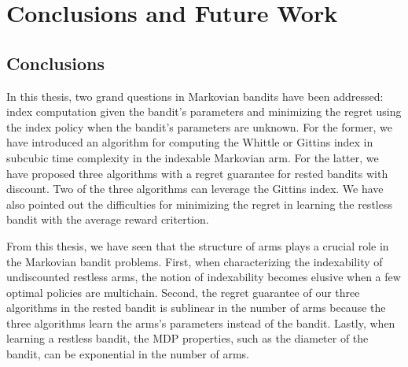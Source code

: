 \begingroup

\let\clearpage\relax

\chapter{Conclusions and Future Work}
\label{chapter:conclusion}


\section{Conclusions}

In this thesis, two grand questions in Markovian bandits have been addressed: index computation given the bandit's parameters and minimizing the regret using the index policy when the bandit's parameters are unknown.
For the former, we have introduced an algorithm for computing the Whittle or Gittins index in subcubic time complexity in the indexable Markovian arm. 
For the latter, we have proposed three algorithms with a regret guarantee for rested bandits with discount.
Two of the three algorithms can leverage the Gittins index.
We have also pointed out the difficulties for minimizing the regret in learning the restless bandit with the average reward critertion.

From this thesis, we have seen that the structure of arms plays a crucial role in the Markovian bandit problems.
First, when characterizing the indexability of undiscounted restless arms, the notion of indexability becomes elusive when a few optimal policies are multichain.
Second, the regret guarantee of our three algorithms in the rested bandit is sublinear in the number of arms because the three algorithms learn the arms's parameters instead of the bandit.
Lastly, when learning a restless bandit, the MDP properties, such as the diameter of the bandit, can be exponential in the number of arms.

